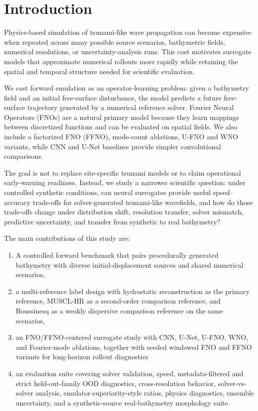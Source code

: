 \section{Introduction}
\setlength{\parskip}{1em}

Physics-based simulation of tsunami-like wave propagation can become expensive when repeated across many possible source scenarios, bathymetric fields, numerical resolutions, or uncertainty-analysis runs. This cost motivates surrogate models that approximate numerical rollouts more rapidly while retaining the spatial and temporal structure needed for scientific evaluation.

We cast forward emulation as an operator-learning problem: given a bathymetry field and an initial free-surface disturbance, the model predicts a future free-surface trajectory generated by a numerical reference solver. Fourier Neural Operators (FNOs) are a natural primary model because they learn mappings between discretized functions and can be evaluated on spatial fields. We also include a factorized FNO (FFNO), mode-count ablations, U-FNO and WNO variants, while CNN and U-Net baselines provide simpler convolutional comparisons.

The goal is not to replace site-specific tsunami models or to claim operational early-warning readiness. Instead, we study a narrower scientific question: under controlled synthetic conditions, can neural surrogates provide useful speed--accuracy trade-offs for solver-generated tsunami-like wavefields, and how do those trade-offs change under distribution shift, resolution transfer, solver mismatch, predictive uncertainty, and transfer from synthetic to real bathymetry?

\noindent
The main contributions of this study are:

\begin{enumerate}[leftmargin=3.6em]
    \item A controlled forward benchmark that pairs procedurally generated bathymetry with diverse initial-displacement sources and shared numerical scenarios,
    \item a multi-reference label design with hydrostatic reconstruction as the primary reference, MUSCL-HR as a second-order comparison reference, and Boussinesq as a weakly dispersive comparison reference on the same scenarios,
    \item an FNO/FFNO-centered surrogate study with CNN, U-Net, U-FNO, WNO, and Fourier-mode ablations, together with seeded windowed FNO and FFNO variants for long-horizon rollout diagnostics
    \item an evaluation suite covering solver validation, speed, metadata-filtered and strict held-out-family OOD diagnostics, cross-resolution behavior, solver-vs-solver analysis, emulator-superiority-style ratios, physics diagnostics, ensemble uncertainty, and a synthetic-source real-bathymetry morphology suite.
\end{enumerate}
